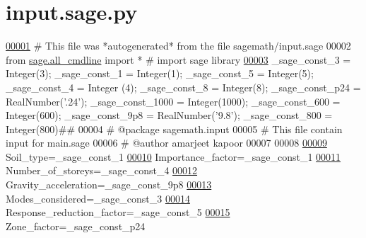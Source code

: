 \hypertarget{input_8sage_8py_source}{}\section{input.\+sage.\+py}
\label{input_8sage_8py_source}

\begin{DoxyCode}
\hypertarget{input_8sage_8py_source_l00001}{}\hyperlink{namespaceinput}{00001} \textcolor{comment}{# This file was *autogenerated* from the file sagemath/input.sage}
00002 \textcolor{keyword}{from} \hyperlink{namespacesage_1_1all__cmdline}{sage.all\_cmdline} \textcolor{keyword}{import} *   \textcolor{comment}{# import sage library}
\hypertarget{input_8sage_8py_source_l00003}{}\hyperlink{namespaceinput_a807fd6f7029374e2d9e918088f60bb88}{00003} \_sage\_const\_3 = Integer(3); \_sage\_const\_1 = Integer(1); \_sage\_const\_5 = Integer(5); \_sage\_const\_4 = Integer
      (4); \_sage\_const\_8 = Integer(8); \_sage\_const\_p24 = RealNumber(\textcolor{stringliteral}{'.24'}); \_sage\_const\_1000 = Integer(1000); 
      \_sage\_const\_600 = Integer(600); \_sage\_const\_9p8 = RealNumber(\textcolor{stringliteral}{'9.8'}); \_sage\_const\_800 = Integer(800)\textcolor{comment}{##}
00004 \textcolor{comment}{# @package sagemath.input}
00005 \textcolor{comment}{# This file contain input for main.sage}
00006 \textcolor{comment}{# @author amarjeet kapoor}
00007 
00008 
\hypertarget{input_8sage_8py_source_l00009}{}\hyperlink{namespaceinput_a6221ae01cf2fb9e8cd22204749785a0e}{00009} Soil\_type=\_sage\_const\_1 
\hypertarget{input_8sage_8py_source_l00010}{}\hyperlink{namespaceinput_a0840d963ea24db338f3ab4457defb494}{00010} Importance\_factor=\_sage\_const\_1 
\hypertarget{input_8sage_8py_source_l00011}{}\hyperlink{namespaceinput_a10237b312ba44e8c8090db86059c5803}{00011} Number\_of\_storeys=\_sage\_const\_4 
\hypertarget{input_8sage_8py_source_l00012}{}\hyperlink{namespaceinput_a55ab15c1c171513e99332aa50c723764}{00012} Gravity\_acceleration=\_sage\_const\_9p8 
\hypertarget{input_8sage_8py_source_l00013}{}\hyperlink{namespaceinput_adb7aca4735796aaa4a46456d3edeac2e}{00013} Modes\_considered=\_sage\_const\_3 
\hypertarget{input_8sage_8py_source_l00014}{}\hyperlink{namespaceinput_aa6d0078a6d934c0d515d85059525e938}{00014} Response\_reduction\_factor=\_sage\_const\_5 
\hypertarget{input_8sage_8py_source_l00015}{}\hyperlink{namespaceinput_aeea70e58ec9bb0d3d6c4363867eb0f82}{00015} Zone\_factor=\_sage\_const\_p24 

\end{DoxyCode}
